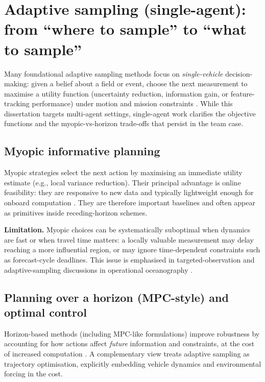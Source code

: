\section{Adaptive sampling (single-agent): from ``where to sample'' to ``what to sample''} \label{sec:single_agent}

Many foundational adaptive sampling methods focus on \emph{single-vehicle} decision-making: given a belief about a field or event,
choose the next measurement to maximise a utility function (uncertainty reduction, information gain, or feature-tracking performance)
under motion and mission constraints \parencite{hwang2019auvreview,lermusiaux2007adaptive}. While this dissertation targets multi-agent
settings, single-agent work clarifies the objective functions and the myopic-vs-horizon trade-offs that persist in the team case.

\subsection{Myopic informative planning}
Myopic strategies select the next action by maximising an immediate utility estimate (e.g., local variance reduction).
Their principal advantage is online feasibility: they are responsive to new data and typically lightweight enough for onboard computation
\parencite{hwang2019auvreview}. They are therefore important baselines and often appear as primitives inside receding-horizon schemes.

\textbf{Limitation.} Myopic choices can be systematically suboptimal when dynamics are fast or when travel time matters:
a locally valuable measurement may delay reaching a more influential region, or may ignore time-dependent constraints such as forecast-cycle deadlines.
This issue is emphasised in targeted-observation and adaptive-sampling discussions in operational oceanography \parencite{lermusiaux2007adaptive,curtin2009aosn}.

\subsection{Planning over a horizon (MPC-style) and optimal control}
Horizon-based methods (including MPC-like formulations) improve robustness by accounting for how actions affect \emph{future} information and constraints,
at the cost of increased computation \parencite{hwang2019auvreview}. A complementary view treats adaptive sampling as trajectory optimisation, explicitly
embedding vehicle dynamics and environmental forcing in the cost.

